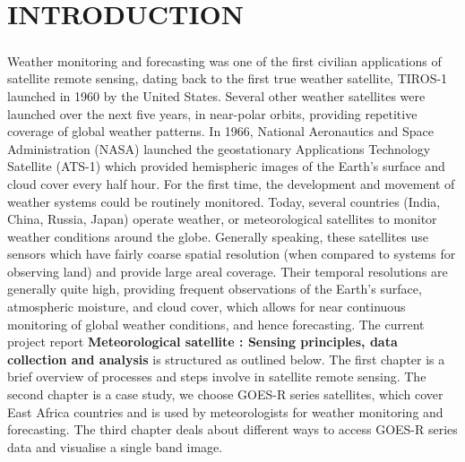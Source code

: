 \chapter*{\normalsize{\textbf{INTRODUCTION}}}
\paragraph{}
Weather monitoring and forecasting was one of the first civilian applications of satellite 
remote sensing, dating back to the first true weather satellite, TIROS-1 launched in 1960 by the United States. %
Several other weather satellites were launched over the next five years, in near-polar orbits, providing repetitive 
coverage of global weather patterns. %
In 1966,  National Aeronautics and Space Administration (NASA) launched the geostationary Applications Technology 
Satellite (ATS-1) which provided hemispheric images of the Earth's surface and cloud cover every half hour. 
For the first time, the development and movement of weather systems could be routinely monitored. %
Today, several countries (India, China, Russia, Japan) operate weather, or 
meteorological satellites to monitor weather conditions around the globe. %
Generally speaking, these satellites use sensors which have fairly coarse spatial resolution (when compared to 
systems for observing land) and provide large areal coverage. 
Their temporal resolutions are generally quite high, providing frequent observations of the 
Earth's surface, atmospheric moisture, and cloud cover, which allows for near continuous 
monitoring of global weather conditions, and hence  forecasting.\newline
The current project report \textbf{ Meteorological  satellite : Sensing principles, data collection  and analysis} is structured as outlined below.\newline
The first chapter is a brief overview of processes and steps involve in satellite remote sensing. \newline
The second chapter is a case study, we choose GOES-R  series satellites, which cover East Africa countries and is used by meteorologists for weather monitoring and forecasting. \newline
The third chapter deals about different ways to access GOES-R series data and visualise a single band image. \newline
